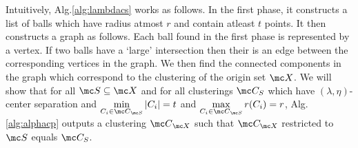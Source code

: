 \documentclass[11pt]{article}
\begin{document}

Intuitively, Alg.\ref{alg:lambdacs} works as follows. In the first phase, it constructs a list of balls which have radius atmost $r$ and contain atleast $t$ points. It then constructs a graph as follows. Each ball found in the first phase is represented by a vertex. If two balls have a `large' intersection then their is an edge between the corresponding vertices in the graph. We then find the connected components in the graph which correspond to the clustering of the origin set $\mc X$. We will show that for all $\mc S \subseteq \mc X$ and for all clusterings $\mc C_S$ which have $(\lambda, \eta)$-center separation and $\min\limits_{C_i \in {\mc C}_{\mc S}} |C_i| = t$ and $\max\limits_{C_i \in {\mc C}_{\mc S}} r(C_i) = r$, Alg. \ref{alg:alphacp} outputs a clustering ${\mc C}_{\mc X}$ such that $\mc C_{\mc X}$ restricted to $\mc S$ equals $\mc C_S$. %
\end{document}
